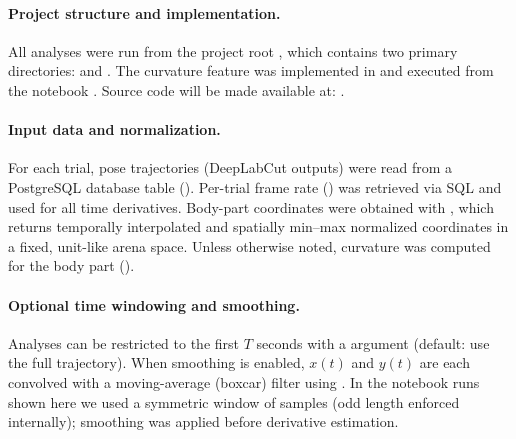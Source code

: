 \paragraph{Project structure and implementation.}
All analyses were run from the project root , which contains two primary directories:  and . The curvature feature was implemented in \href{https://github.com/atanugiri/GhrelinBehaviorQuantification/blob/main/Python_scripts/Feature_functions/trajectory_curvature.py}{} and executed from the notebook \href{https://github.com/atanugiri/GhrelinBehaviorQuantification/blob/main/DLC-Jupyter-Notebooks/37_data_analysis_curvature.ipynb}{}. Source code will be made available at: \href{https://github.com/atanugiri/GhrelinBehaviorQuantification}{}.

\paragraph{Input data and normalization.}
For each trial, pose trajectories (DeepLabCut outputs) were read from a PostgreSQL database table (). Per-trial frame rate () was retrieved via SQL and used for all time derivatives. Body-part coordinates were obtained with \href{https://github.com/atanugiri/GhrelinBehaviorQuantification/blob/main/Python_scripts/Data_analysis/normalized_bodypart.py}{}, which returns temporally interpolated and spatially min–max normalized coordinates in a fixed, unit-like arena space. Unless otherwise noted, curvature was computed for the  body part ().

\paragraph{Optional time windowing and smoothing.}
Analyses can be restricted to the first $T$ seconds with a  argument (default: use the full trajectory). When smoothing is enabled, $x(t)$ and $y(t)$ are each convolved with a moving-average (boxcar) filter using . In the notebook runs shown here we used a symmetric window of  samples (odd length enforced internally); smoothing was applied before derivative estimation.

